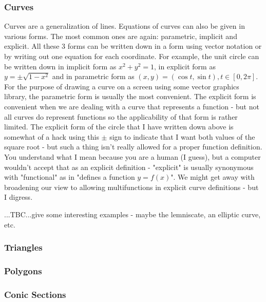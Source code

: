 \subsubsection{Curves}
Curves are a generalization of lines. Equations of curves can also be given in various forms. The most common ones are again: parametric, implicit and explicit. All these 3 forms can be written down in a form using vector notation or by writing out one equation for each coordinate. For example, the unit circle can be written down in implicit form as $x^2 + y^2 = 1$, in explicit form as $y = \pm \sqrt{1 - x^2}$ and in parametric form as $(x,y) = (\cos t, \sin t), t \in [0, 2 \pi]$. For the purpose of drawing a curve on a screen using some vector graphics library, the parametric form is usually the most convenient. The explicit form is convenient when we are dealing with a curve that represents a function - but not all curves do represent functions so the applicability of that form is rather limited. The explicit form of the circle that I have written down above is somewhat of a hack using this $\pm$ sign to indicate that I want both values of the square root - but such a thing isn't really allowed for a proper function definition. You understand what I mean because you are a human (I guess), but a computer wouldn't accept that as an explicit definition - "explicit" is usually synonymous with "functional" as in "defines a function $y = f(x)$". We might get away with broadening our view to allowing multifunctions in explicit curve definitions - but I digress.

...TBC...give some interesting examples - maybe the lemniscate, an elliptic curve, etc.

\subsubsection{Triangles}


\subsubsection{Polygons}


\subsubsection{Conic Sections}

